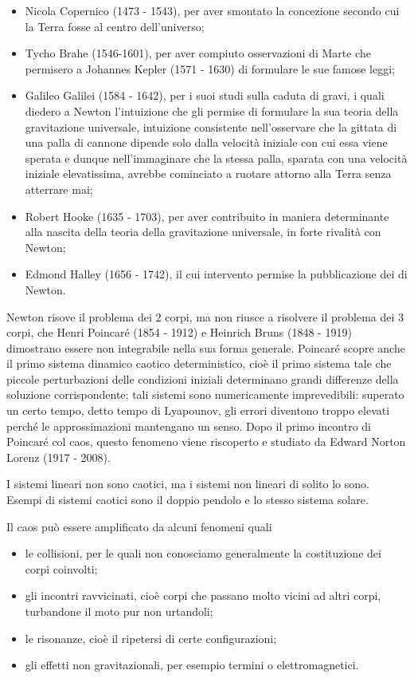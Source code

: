 \begin{itemize}
	\item Nicola Copernico (1473 - 1543), per aver smontato la concezione secondo cui la Terra fosse al centro dell'universo;
	\item Tycho Brahe (1546-1601), per aver compiuto osservazioni di Marte che permisero a Johannes Kepler (1571 - 1630) di formulare le sue famose leggi;
	\item Galileo Galilei (1584 - 1642), per i suoi studi sulla caduta di gravi, i quali diedero a Newton l'intuizione che gli permise di formulare la sua teoria della gravitazione universale, intuizione consistente nell'osservare che la gittata di una palla di cannone dipende solo dalla velocit\`a iniziale con cui essa viene sperata e dunque nell'immaginare che la stessa palla, sparata con una velocit\`a iniziale elevatissima, avrebbe cominciato a ruotare attorno alla Terra senza atterrare mai;
	\item Robert Hooke (1635 - 1703), per aver contribuito in maniera determinante alla nascita della teoria della gravitazione universale, in forte rivalit\`a con Newton;
	\item Edmond Halley (1656 - 1742), il cui intervento permise la pubblicazione dei  di Newton.
\end{itemize}
\par Newton risove il problema dei $2$ corpi, ma non riusce a risolvere il problema dei $3$ corpi, che Henri Poincar\'e (1854 - 1912) e Heinrich Bruns (1848 - 1919) dimostrano essere non integrabile nella sua forma generale. Poincar\'e scopre anche il primo sistema dinamico caotico deterministico, cio\`e il primo sistema tale che piccole perturbazioni delle condizioni iniziali determinano grandi differenze della soluzione corrispondente; tali sistemi sono numericamente imprevedibili: superato un certo tempo, detto tempo di Lyapounov, gli errori diventono troppo elevati perch\'e le approssimazioni mantengano un senso. Dopo il primo incontro di Poincar\'e col caos, questo fenomeno viene riscoperto e studiato da Edward Norton Lorenz (1917 - 2008).
\par I sistemi lineari non sono caotici, ma i sistemi non lineari di solito lo sono. Esempi di sistemi caotici sono il doppio pendolo e lo stesso sistema solare.
\par Il caos pu\`o essere amplificato da alcuni fenomeni quali
\begin{itemize}
	\item le collisioni, per le quali non conosciamo generalmente la costituzione dei corpi coinvolti;
	\item gli incontri ravvicinati, cio\`e corpi che passano molto vicini ad altri corpi, turbandone il moto pur non urtandoli;
	\item le risonanze, cio\`e il ripetersi di certe configurazioni;
	\item gli effetti non gravitazionali, per esempio termini o elettromagnetici.
\end{itemize}
